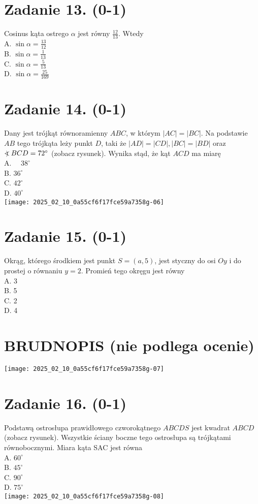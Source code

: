 \documentclass[10pt]{article}
\newcommand\Varangle{\mathop{{<\!\!\!\!\!\text{\small)}}\:}\nolimits}
\begin{document}
\section*{Zadanie 13. (0-1)}
Cosinus kąta ostrego \(\alpha\) jest równy \(\frac{12}{13}\). Wtedy\\
A. \(\sin \alpha=\frac{13}{12}\)\\
B. \(\sin \alpha=\frac{1}{13}\)\\
C. \(\sin \alpha=\frac{5}{13}\)\\
D. \(\sin \alpha=\frac{25}{169}\)

\section*{Zadanie 14. (0-1)}
Dany jest trójkąt równoramienny \(A B C\), w którym \(|A C|=|B C|\). Na podstawie \(A B\) tego trójkąta leży punkt \(D\), taki że \(|A D|=|C D|,|B C|=|B D|\) oraz \(\Varangle B C D=72^{\circ}\) (zobacz rysunek). Wynika stąd, że kąt \(A C D\) ma miarę\\
A. \(\quad 38^{\circ}\)\\
B. \(36^{\circ}\)\\
C. \(42^{\circ}\)\\
D. \(40^{\circ}\)\\
\texttt{[image: 2025\_02\_10\_0a55cf6f17fce59a7358g-06]}

\section*{Zadanie 15. (0-1)}
Okrąg, którego środkiem jest punkt \(S=(a, 5)\), jest styczny do osi \(O y\) i do prostej o równaniu \(y=2\). Promień tego okręgu jest równy\\
A. 3\\
B. 5\\
C. 2\\
D. 4

\section*{BRUDNOPIS (nie podlega ocenie)}
\begin{center}
\texttt{[image: 2025\_02\_10\_0a55cf6f17fce59a7358g-07]}
\end{center}

\section*{Zadanie 16. (0-1)}
Podstawą ostrosłupa prawidłowego czworokątnego \(A B C D S\) jest kwadrat \(A B C D\) (zobacz rysunek). Wszystkie ściany boczne tego ostrosłupa są trójkątami równobocznymi. Miara kąta SAC jest równa\\
A. \(60^{\circ}\)\\
B. \(45^{\circ}\)\\
C. \(90^{\circ}\)\\
D. \(75^{\circ}\)\\
\texttt{[image: 2025\_02\_10\_0a55cf6f17fce59a7358g-08]}
\end{document}

